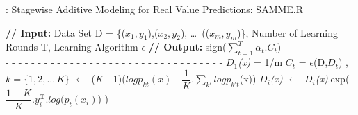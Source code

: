 \documentclass[10pt,journal,compsoc]{IEEEtran}
\begin{document}
\begin{algorithm}[!t]
\caption{: Stagewise Additive Modeling for Real Value Predictions: SAMME.R }\label{alg:sammer}
\begin{algorithmic}[1]
\footnotesize
\STATE \textbf{// Input:} Data Set D = \{(\(x_1, y_1\)),(\(x_2, y_2\)), \dots\, ((\(x_m, y_m\))\}, Number of Learning Rounds T, Learning Algorithm $ \epsilon $  
\STATE \textbf{// Output:} sign($\sum_{t=1}^{T} \alpha_t.C_t$)
\STATE - - - - - - - - - - - - - - - - - - - - - - - - - - - - - - - - - - - - - - - - - - - - -
\STATE \emph{$D_1$(x)} = 1/m 
\STATE \emph{$C_t$} = $\epsilon$(D,\emph{$D_t$}) 
, $ k = \{1, 2, \dots\, K\}$
 $\leftarrow$ ($K$ - 1)($log{p_{kt}(x)}$ - $\dfrac{1}{K}.\sum_{k'} log{p_{k't}}$(x))
\STATE \emph{$D_i$(x)} $\leftarrow$ \emph{$D_i$(x)}.exp($\dfrac{1-K}{K}$.$y_{i}^{ \textbf{T} }.log({p_t}(x_i)$)    ) 
\ENDFOR 
\end{algorithmic}
\end{algorithm}
\end{document}
